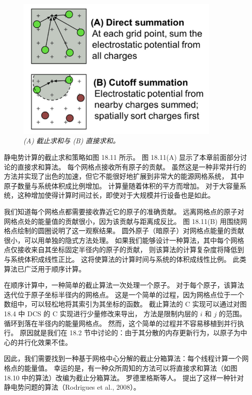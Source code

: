 \begin{figure}[H]
	\centering
	\includegraphics[width=0.9\textwidth]{figs/F18.11.png}
	\caption{\textit{(A) 截止求和与 (B) 直接求和。}}
\end{figure}

静电势计算的截止求和策略如图 18.11 所示。 图 18.11(A) 显示了本章前面部分讨论的直接求和算法。 
每个网格点接收所有原子的贡献。 虽然这是一种非常并行的方法并实现了出色的加速，但它不能很好地扩展到非常大的能源网格系统，
其中原子数量与系统体积成比例增加。 计算量随着体积的平方而增加。 
对于大容量系统，这种增加使得计算时间过长，即使对于大规模并行设备也是如此。

我们知道每个网格点都需要接收靠近它的原子的准确贡献。 远离网格点的原子对网格点处的能量值的贡献很小，因为该贡献与距离成反比。 
图 18.11(B) 用围绕网格点绘制的圆圈说明了这一观察结果。 
圆外原子（暗原子）对网格点能量的贡献很小，可以用单独的隐式方法处理。 
如果我们能够设计一种算法，其中每个网格点仅接收来自其坐标固定半径内的原子的贡献，
则该算法的计算复杂度将降低到与系统体积成线性正比。 这将使算法的计算时间与系统的体积成线性比例。 此类算法已广泛用于顺序计算。

在顺序计算中，一种简单的截止算法一次处理一个原子。 
对于每个原子，该算法迭代位于原子坐标半径内的网格点。 
这是一个简单的过程，因为网格点位于一个数组中，可以轻松地将其索引为其坐标的函数。 
截止算法的 $\mathrm{C}$ 实现可以通过对图 18.4 中 DCS 的 $\mathrm{C}$ 实现进行少量修改来导出，
方法是限制内层的 $i$ 和 $j$ 的范围。 循环到落在半径内的能量网格点。 然而，这个简单的过程并不容易移植到并行执行。 
原因就是我们在 18.2 节中讨论的：由于其分散的内存更新行为，以原子为中心的并行化效果不佳。

因此，我们需要找到一种基于网格中心分解的截止分箱算法：每个线程计算一个网格点的能量值。 
幸运的是，有一种众所周知的方法可以将直接求和算法（如图 18.10 中的算法）改编为截止分箱算法。 
罗德里格斯等人。 提出了这样一种针对静电势问题的算法（Rodrigues et al., 2008）。

